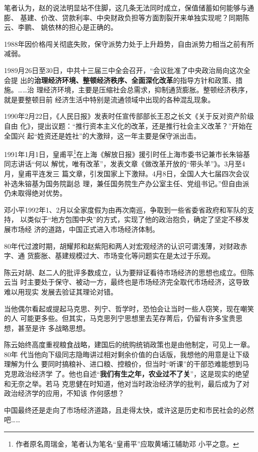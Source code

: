 笔者认为，赵的说法明显站不住脚，这几条无法同时成立，保值储蓄如何能够与通膨、
基建、价改、贷款利率、中央财政负担等方面割裂开来单独实现呢？同期陈云、李鹏、
姚依林的担心是正确的。

1988年因价格闯关彻底失败，保守派势力处于上升趋势，自由派势力相当之前有所减弱。

1989月26日至30日，中共十三届三中全会召开，“会议批准了中央政治局向这次全会提
出的\textbf{治理经济环境、整顿经济秩序、全面深化改革}的指导方针和政策、措施。……治
理经济环境，主要是压缩社会总需求，抑制通货膨胀。整顿经济秩序，就是要整顿目前
经济生活中特别是流通领域中出现的各种混乱现象。

1990年2月22日，《人民日报》发表时任宣传部部长王忍之长文《关于反对资产阶级自由
化》，提出议题：“推行资本主义化的改革，还是推行社会主义改革？”开始在全国兴
起“姓资还是姓社”的大激辩，这一年主要是保守派出击。

1991年1月1日，皇甫平\footnote{作者原名周瑞金，笔者认为笔名“皇甫平”应取黄埔江辅助邓
  小平之意。}在上海《解放日报》援引时任上海市委书记兼市长朱镕基同志讲话“何以
解忧，唯有改革”，发表文章《做改革开放的“带头羊”》。3月至4月，皇甫平连发三
篇文章，引发国家上下激辩。4月8日，全国人大七届四次会议补选朱镕基为国务院副总
理，兼任国务院生产办公室主任、党组书记。”但自由派仍未取得绝对优势。

邓小平1992年1、2月以全家度假为由再次南巡，争取到一些省委省政府和军队的支持，
以类似于“地方包围中央”的方式，实现了他的政治抱负，确定了坚定不移发展市场经
济的道路，中国正式进入市场经济体制。

80年代过渡时期，胡耀邦和赵紫阳和两人对宏观经济的认识可谓浅薄，对财政赤字、通
货膨胀、基建规模过大、市场变化等问题实在是太过于乐观。

陈云对胡、赵二人的批评多数成立，认为要辩证看待市场经济的思想也成立。但陈云当
时主要处于保守、被动一方，最终也是市场经济完全取代市场经济，这导致难以用现实
发展去验证其理论对错。

当他偶尔看起或提起马克思、列宁、哲学时，恐怕会让当时一些人窃笑，现在嘲笑的人
可能更多些。但其实，马克思列宁思想里去芜存菁后，仍留有许多宝贵思想，甚至是许
多战略思想。

陈云始终高度重视粮食战略，建国后的统购统销政策也是由他制定，可见上一章。80年
代当他向下级同志隐晦讲过相对剩余价值的白话版，我想他的用意是让下级理解为什么
要同时搞粮补、进口粮、控粮价，但当时“听课”的干部恐难能想到马克思政治经济学
了。他也自述“\textbf{我们有生之年，农业过不了关}”，这是现实的绝望和无奈之举。若马
克思健在时知道，他对当时政治经济学的批判，最后成为了对政治经济学的应用，不知该
作何感想？

中国最终还是走向了市场经济道路，且走得太快，或许这是历史和市民社会的必然吧……

